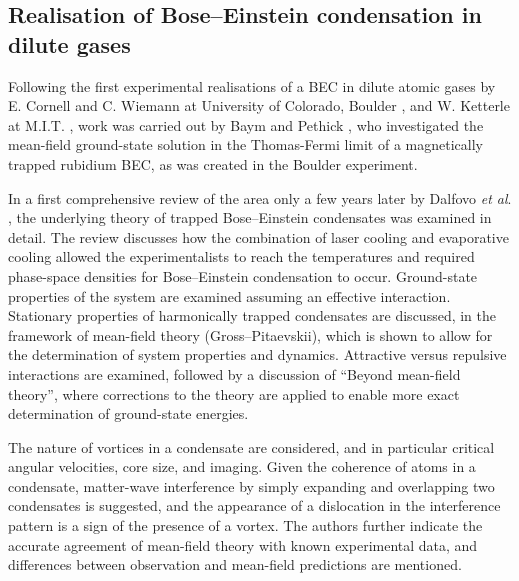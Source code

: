 \subsection{Realisation of Bose--Einstein condensation in dilute gases}\label{sub:becdev}
Following the first experimental realisations of a BEC in dilute atomic gases by E. Cornell and C. Wiemann at University of Colorado, Boulder \cite{BEC:Cornell_science_1995}, and W. Ketterle at M.I.T. \cite{BEC:Ketterle_prl_1995}, work was carried out by Baym and Pethick \cite{BEC:Baym_prl_1996}, who investigated the mean-field ground-state solution in the Thomas-Fermi limit of a magnetically trapped rubidium BEC, as was created in the Boulder experiment.

In a first comprehensive review of the area only a few years later by Dalfovo \textit{et al}. \cite{BEC:Dalfovo_revmod_1999}, the underlying theory of trapped Bose--Einstein condensates was examined in detail. The review discusses how the combination of laser cooling and evaporative cooling \cite{AO:Ketterle_amop_1996} allowed the experimentalists to reach the temperatures and required phase-space densities for Bose--Einstein condensation to occur. Ground-state properties of the system are examined assuming an effective interaction. Stationary properties of harmonically trapped condensates are discussed, in the framework of mean-field theory (Gross--Pitaevskii), which is shown to allow for the determination of system properties and dynamics. Attractive versus repulsive interactions are examined, followed by a discussion of ``Beyond mean-field theory'', where corrections to the theory are applied to enable more exact determination of ground-state energies.

The nature of vortices in a condensate are considered, and in particular critical angular velocities, core size, and imaging. Given the coherence of atoms in a condensate, matter-wave interference by simply expanding and overlapping two condensates is suggested, and the appearance of a dislocation in the interference pattern is a sign of the presence of a vortex. The authors further indicate the accurate agreement of mean-field theory with known experimental data, and differences between observation and mean-field predictions are mentioned. %

